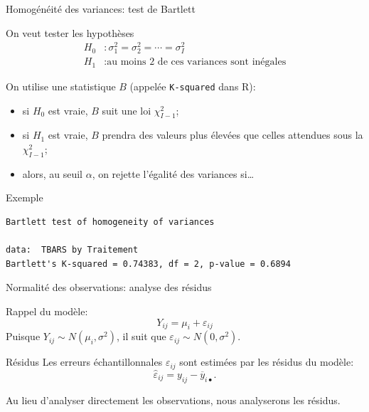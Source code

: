 \documentclass{BeamerTemplate}
\begin{document}
\begin{frame}[t]{Homogénéité des variances: test de Bartlett}

On veut tester les hypothèses
\begin{align*}
H_0 &: \sigma_1^2=\sigma_2^2=\cdots=\sigma_I^2\\
H_1 &: \text{au moins 2 de ces variances sont inégales}
\end{align*}

On utilise une statistique $B$ (appelée \texttt{K-squared} dans R):
\begin{itemize}\itemsep2mm
  \item<2-> si $H_0$ est vraie, $B$ suit une loi $\chi^2_{I-1}$;
  \item<3-> si $H_1$ est vraie, $B$ prendra des valeurs plus élevées que celles
  attendues sous la $\chi^2_{I-1}$;
  \item<4-> alors, au seuil $\alpha$, on rejette l'égalité des variances si\ldots
\end{itemize}

\end{frame}

\begin{frame}[fragile,t]{Exemple}

\vspace{1cm}
\begin{Verbatim}[fontsize=\small]
        Bartlett test of homogeneity of variances

data:  TBARS by Traitement
Bartlett's K-squared = 0.74383, df = 2, p-value = 0.6894
\end{Verbatim}

\bigskip
{}

\end{frame}

\begin{frame}[t]{Normalité des observations: analyse des résidus}

Rappel du modèle:
\[
Y_{ij}=\mu_i+\varepsilon_{ij}
\]
Puisque $Y_{ij}\sim N(\mu_i,\sigma^2)$, il suit que $\varepsilon_{ij}\sim N(0,\sigma^2)$.

\medskip
\begin{Boite}{Résidus}
Les erreurs échantillonnales $\varepsilon_{ij}$ sont estimées par les
\alert{résidus} du modèle:
\[
\hat\varepsilon_{ij}=y_{ij}-\overline{y}_{i\bullet}.
\]
\end{Boite}

Au lieu d'analyser directement les observations, nous analyserons les résidus.

\end{frame}
\end{document}
